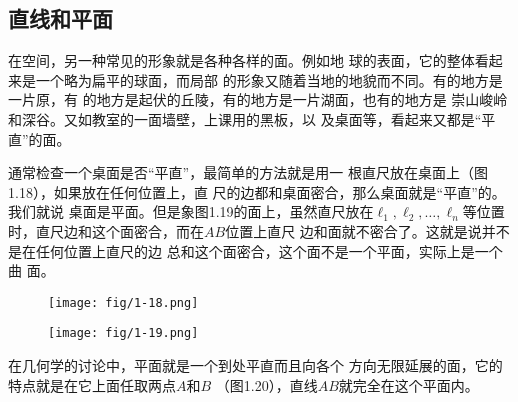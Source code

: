 \subsection{直线和平面}
在空间，另一种常见的形象就是各种各样的面。例如地
球的表面，它的整体看起来是一个略为扁平的球面，而局部
的形象又随着当地的地貌而不同。有的地方是一片原，有
的地方是起伏的丘陵，有的地方是一片湖面，也有的地方是
崇山峻岭和深谷。又如教室的一面墙壁，上课用的黑板，以
及桌面等，看起来又都是“平直”的面。

通常检查一个桌面是否“平直”，最简单的方法就是用一
根直尺放在桌面上（图1.18），如果放在任何位置上，直
尺的边都和桌面密合，那么桌面就是“平直”的。我们就说
桌面是平面。但是象图1.19的面上，虽然直尺放在$\ell_1,\ell_2,\ldots,\ell_n$等位置时，直尺边和这个面密合，而在$AB$位置上直尺
边和面就不密合了。这就是说并不是在任何位置上直尺的边
总和这个面密合，这个面不是一个平面，实际上是一个曲
面。
\begin{figure}[htp]\centering
    \begin{minipage}[t]{0.48\textwidth}
    \centering
	\texttt{[image: fig/1-18.png]}
    \caption{}
    \end{minipage}
    \begin{minipage}[t]{0.48\textwidth}
    \centering
	\texttt{[image: fig/1-19.png]}
    \caption{}
    \end{minipage}
    \end{figure}

在几何学的讨论中，平面就是一个到处平直而且向各个
方向无限延展的面，它的特点就是在它上面任取两点$A$和$B$
（图1.20），直线$AB$就完全在这个平面内。

\begin{figure}[htp]\centering
    \begin{minipage}[t]{0.48\textwidth}
    \centering
{}
    \caption{}
    \end{minipage}
    \begin{minipage}[t]{0.48\textwidth}
    \centering
    \caption{}
    \end{minipage}
    \end{figure}


